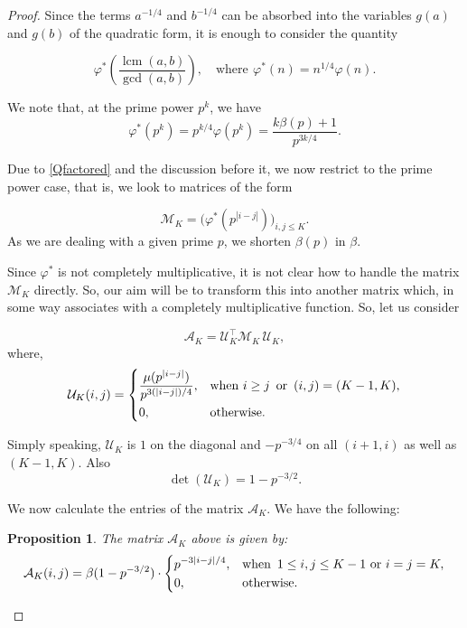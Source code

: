 \documentclass[a4paper,12pt, reqn0]{amsart}
\newtheorem{proposition}{Proposition}[section]
\theoremstyle{remark}
\newcommand{\bt}{\beta}
\newcommand{\U}{\mathcal{U}}
\newcommand{\Mcal}{\mathcal{M}}
\newcommand{\A}{\mathcal{A}}
\DeclareMathOperator{\lcm}{lcm}
\begin{document}
\begin{proof}
Since the terms $a^{-1/4}$ and $b^{-1/4}$ can be absorbed into the variables $g(a)$ and $g(b)$ of the quadratic form, it is enough to consider the quantity  

$$
\varphi^*\left( \frac{\lcm(a,b)}{\gcd(a,b)}  \right), \quad \text{where} \ \, \varphi^*(n) = n^{1/4} \varphi(n) .
$$

We note that, at the prime power $p^k$, we have
\begin{equation}
\label{gval}
\varphi^*(p^k) = p^{k/4} \varphi(p^k) =\frac{k \bt(p) + 1 }{p^{3k/4}} . 
\end{equation}

Due to \eqref{Qfactored} and the discussion before it, we now restrict to the prime power case, that is, we look to matrices of the form 

\begin{equation*}
\Mcal_{K} = \bigl(  \varphi^*(p^{|i-j|}) \bigr)_{i,j \leq K}.  
\end{equation*}
As we are dealing with a given prime $p$, we shorten $\beta(p)$ in $\bt$.

\medskip

Since $\varphi^*$ is not completely multiplicative, it is not clear how to handle the matrix $\Mcal_K$ directly. So, our aim will be to transform this into another matrix which, in some way associates with a completely multiplicative function.  
So, let us consider

$$
\A_K = \U_K^{\top} \Mcal_K \, \U_K,
$$
where,
\begin{equation}
\label{Uij}
\U_K(i,j) = \begin{dcases}  \frac{\mu(p^{|i-j|})}{p^{3(|i-j|)/4}}, & \text{when } i \geq j \, \text{ or } \, (i,j) = (K-1, K),  \\0, & \text{otherwise.}  \end{dcases}
\end{equation}

Simply speaking, $\U_K$ is $1$ on the diagonal and $-p^{-3/4}$ on all $(i+1,i)$ as well as $(K-1, K)$. 
 Also
$$\det(\U_K) = 1 - p^{-3/2} .$$ 

We now calculate the entries of the matrix $\A_K$. We have the following:

\begin{proposition}
\label{proposition A}
The matrix $\A_K$ above is given by:
$$
\A_K(i,j) = \bt(1 - p^{-3/2}) \cdot \begin{dcases} p^{-3|i-j|/4}, & \text{when } \, {1 \leq i, j \leq K-1} \text{ or } i=j=K, \\ 0, & \text{otherwise}. \end{dcases}
$$
\end{proposition}


\end{proof}
\end{document}
